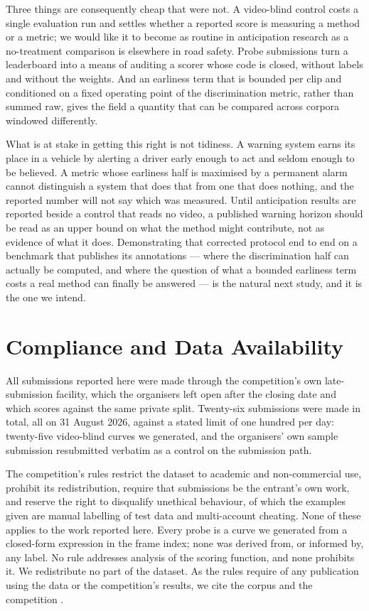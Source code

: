 Three things are consequently cheap that were not. A video-blind control costs a single evaluation run and settles whether a reported score is measuring a method or a metric; we would like it to become as routine in anticipation research as a no-treatment comparison is elsewhere in road safety. Probe submissions turn a leaderboard into a means of auditing a scorer whose code is closed, without labels and without the weights. And an earliness term that is bounded per clip and conditioned on a fixed operating point of the discrimination metric, rather than summed raw, gives the field a quantity that can be compared across corpora windowed differently.

What is at stake in getting this right is not tidiness. A warning system earns its place in a vehicle by alerting a driver early enough to act and seldom enough to be believed. A metric whose earliness half is maximised by a permanent alarm cannot distinguish a system that does that from one that does nothing, and the reported number will not say which was measured. Until anticipation results are reported beside a control that reads no video, a published warning horizon should be read as an upper bound on what the method might contribute, not as evidence of what it does. Demonstrating that corrected protocol end to end on a benchmark that publishes its annotations --- where the discrimination half can actually be computed, and where the question of what a bounded earliness term costs a real method can finally be answered --- is the natural next study, and it is the one we intend.


\section*{Compliance and Data Availability}

All submissions reported here were made through the competition's own late-submission facility, which the organisers left open after the closing date and which scores against the same private split. Twenty-six submissions were made in total, all on 31 August 2026, against a stated limit of one hundred per day: twenty-five video-blind curves we generated, and the organisers' own sample submission resubmitted verbatim as a control on the submission path.

The competition's rules restrict the dataset to academic and non-commercial use, prohibit its redistribution, require that submissions be the entrant's own work, and reserve the right to disqualify unethical behaviour, of which the examples given are manual labelling of test data and multi-account cheating. None of these applies to the work reported here. Every probe is a curve we generated from a closed-form expression in the frame index; none was derived from, or informed by, any label. No rule addresses analysis of the scoring function, and none prohibits it. We redistribute no part of the dataset. As the rules require of any publication using the data or the competition's results, we cite the corpus \citep{fang2024mmau} and the competition \citep{autopilot2026}.


